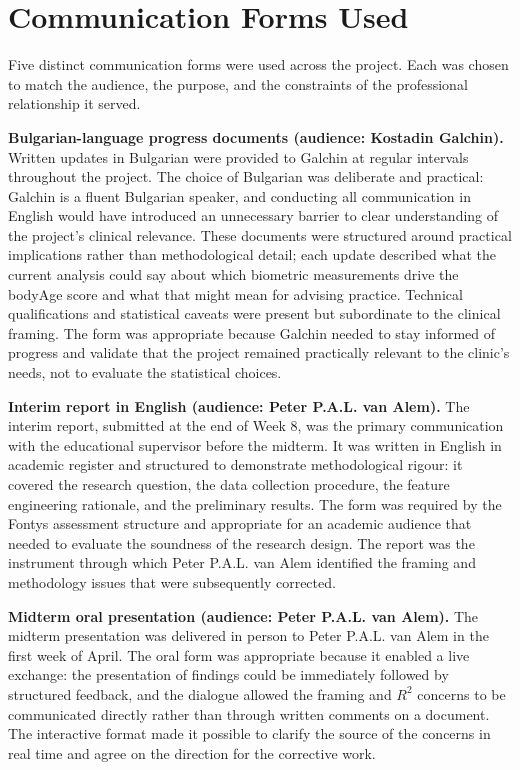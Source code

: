 \documentclass[11pt,a4paper]{report}
\begin{document}
\section{Communication Forms Used}

Five distinct communication forms were used across the project. Each was chosen to match the
audience, the purpose, and the constraints of the professional relationship it served.

\textbf{Bulgarian-language progress documents (audience: Kostadin Galchin).} Written updates in
Bulgarian were provided to Galchin at regular intervals throughout the project. The choice of
Bulgarian was deliberate and practical: Galchin is a fluent Bulgarian speaker, and conducting all
communication in English would have introduced an unnecessary barrier to clear understanding of the
project's clinical relevance. These documents were structured around practical implications rather
than methodological detail; each update described what the current analysis could say about which
biometric measurements drive the bodyAge score and what that might mean for advising practice.
Technical qualifications and statistical caveats were present but subordinate to the clinical
framing. The form was appropriate because Galchin needed to stay informed of progress and validate
that the project remained practically relevant to the clinic's needs, not to evaluate the
statistical choices.

\textbf{Interim report in English (audience: Peter P.A.L. van Alem).} The interim report, submitted at the
end of Week 8, was the primary communication with the educational supervisor before the midterm.
It was written in English in academic register and structured to demonstrate methodological rigour:
it covered the research question, the data collection procedure, the feature engineering rationale,
and the preliminary results. The form was required by the Fontys assessment structure and
appropriate for an academic audience that needed to evaluate the soundness of the research design.
The report was the instrument through which Peter P.A.L. van Alem identified the framing and methodology issues
that were subsequently corrected.

\textbf{Midterm oral presentation (audience: Peter P.A.L. van Alem).} The midterm presentation was delivered
in person to Peter P.A.L. van Alem in the first week of April. The oral form was appropriate because it enabled
a live exchange: the presentation of findings could be immediately followed by structured feedback,
and the dialogue allowed the framing and $R^2$ concerns to be communicated directly rather than
through written comments on a document. The interactive format made it possible to clarify the
source of the concerns in real time and agree on the direction for the corrective work.
\end{document}
